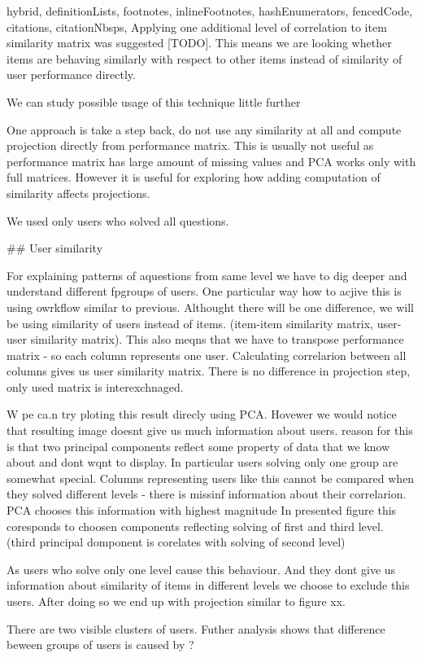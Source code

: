 \documentclass[
  digital, %
  table,   %
  nolof,     %
  nolot,     %
  nocover
]{fithesis3}
\begin{document}
\begin{markdown*}{%
  hybrid,
  definitionLists,
  footnotes,
  inlineFootnotes,
  hashEnumerators,
  fencedCode,
  citations,
  citationNbsps,
}
Applying one additional level of correlation to item similarity matrix was suggested [TODO].
This means we are looking whether items are behaving similarly with respect to other items instead of similarity of user performance directly.

We can study possible usage of this technique little further

One approach is take a step back, do not use any similarity at all and compute projection directly from performance matrix.
This is usually not useful as performance matrix has large amount of missing values and PCA works only with full matrices.
However it is useful for exploring how adding computation of similarity affects projections.

We used only users who solved all questions.

## User similarity

For explaining patterns of aquestions from same level we have to dig deeper and understand different fpgroups of users. One particular way how to acjive this is using owrkflow similar to previous. Althought there will be one difference, we will be using similarity of users instead of items. (item-item similarity matrix, user-user similarity matrix). This also meqns that we have to transpose performance matrix - so each column represents one user. Calculating correlarion between all columns gives us user similarity matrix. There is no difference in projection step, only used matrix is interexchnaged.

W pe ca.n try ploting this result direcly using PCA. Hovewer we would notice that resulting image doesnt give us much information about users. reason for this is that two principal components reflect some property of data that we know about and dont wqnt to display. In particular users solving only one group are somewhat special. Columns representing users like this cannot be compared when they solved different levels - there is missinf information about their correlarion. PCA chooses this information with highest magnitude In presented figure this coresponds to choosen components reflecting solving of first and third level. (third principal domponent is corelates with solving of second level)

As users who solve only one level cause this behaviour. And they dont give us information about similarity of items in different levels we choose to exclude this users. After doing so we end up with projection similar to figure xx.

There are two visible clusters of users. Futher analysis shows that difference beween groups of users is caused by ?


\end{markdown*}
\end{document}

